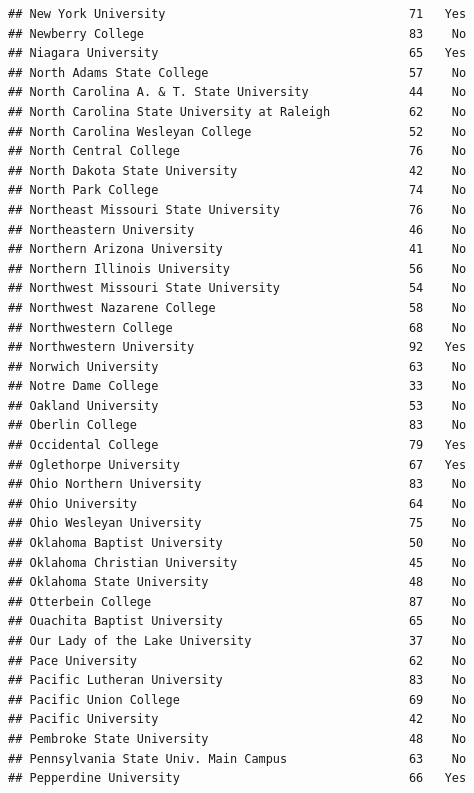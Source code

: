 \documentclass[
]{article}
\begin{document}
\begin{verbatim}
## New York University                                  71   Yes
## Newberry College                                     83    No
## Niagara University                                   65   Yes
## North Adams State College                            57    No
## North Carolina A. & T. State University              44    No
## North Carolina State University at Raleigh           62    No
## North Carolina Wesleyan College                      52    No
## North Central College                                76    No
## North Dakota State University                        42    No
## North Park College                                   74    No
## Northeast Missouri State University                  76    No
## Northeastern University                              46    No
## Northern Arizona University                          41    No
## Northern Illinois University                         56    No
## Northwest Missouri State University                  54    No
## Northwest Nazarene College                           58    No
## Northwestern College                                 68    No
## Northwestern University                              92   Yes
## Norwich University                                   63    No
## Notre Dame College                                   33    No
## Oakland University                                   53    No
## Oberlin College                                      83    No
## Occidental College                                   79   Yes
## Oglethorpe University                                67   Yes
## Ohio Northern University                             83    No
## Ohio University                                      64    No
## Ohio Wesleyan University                             75    No
## Oklahoma Baptist University                          50    No
## Oklahoma Christian University                        45    No
## Oklahoma State University                            48    No
## Otterbein College                                    87    No
## Ouachita Baptist University                          65    No
## Our Lady of the Lake University                      37    No
## Pace University                                      62    No
## Pacific Lutheran University                          83    No
## Pacific Union College                                69    No
## Pacific University                                   42    No
## Pembroke State University                            48    No
## Pennsylvania State Univ. Main Campus                 63    No
## Pepperdine University                                66   Yes

\end{verbatim}
\end{document}
